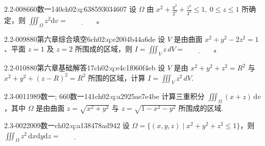 \begin{q}{2.2-008}{660数一140}{ch02:q:638593034607}
设 $\Omega$ 由 $x^2+\frac{y^2}{2^2}+\frac{z^2}{3^2}\leqslant 1,\ 0\leqslant z\leqslant 1$ 所确定，则 $\displaystyle \iiint_{\Omega} z^2 \mathrm{d}v=\underline{\hspace{4em}}$。
\end{q}

\begin{q}{2.2-009}{880第六章综合填空6}{ch02:q:e2004b44a6de}
设 $V$ 是由曲面 $x^{2}+y^{2}-2z^{2}=1$、平面 $z=1$ 及 $z=2$ 所围成的区域，则 $\displaystyle I=\iiint_{V} z\,dV=\underline{\hspace{4em}}$。
\end{q}

\begin{q}{2.2-010}{880第六章基础解答17}{ch02:q:e4c1f060f4eb}
设 $V$ 是由 $x^2+y^2+z^2=R^2$ 与 $x^2+y^2+(z-R)^2=R^2$ 所围的区域，计算 $\displaystyle I=\iiint_V z^2\,dV$.
\end{q}

\par\addvspace{2.4ex}\noindent
\begin{minipage}{\linewidth}

\begin{q}{2.3-001}{1989数一; 660数一141}{ch02:q:a2925ae7e4be}
计算三重积分 $\displaystyle \iiint_{\Omega}(x+z)\,\mathrm{d}v$，其中 $\Omega$ 是由曲面 $z=\sqrt{x^2+y^2}$ 与 $z=\sqrt{1-x^2-y^2}$ 所围成的区域.
\end{q}
\end{minipage}


\begin{q}{2.3-002}{2009数一}{ch02:q:a138478ad942}
设 $\Omega=\{(x,y,z)\mid x^{2}+y^{2}+z^{2}\leqslant 1\}$，则 $\displaystyle\iiint_{\Omega} z^{2}\,\mathrm{d}x\mathrm{d}y\mathrm{d}z=\underline{\hspace{4em}}$
\end{q}

